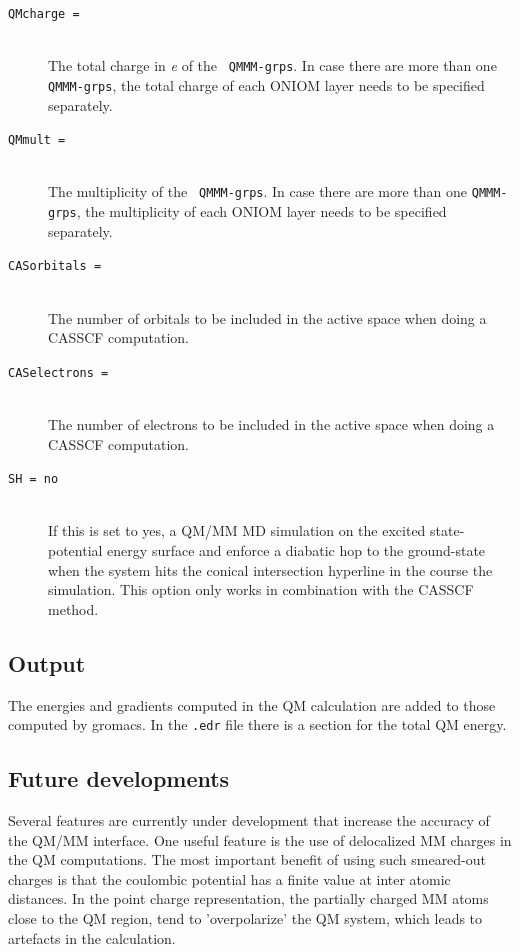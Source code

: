 \begin{description}
\item[\tt QMcharge = ]\mbox{}\\The total charge in {\it{e}} of the {\tt
QMMM-grps}. In case there are more than one {\tt QMMM-grps}, the total
charge of each ONIOM layer needs to be specified separately.

\item[\tt QMmult = ]\mbox{}\\The multiplicity of the {\tt
QMMM-grps}. In case there are more than one {\tt QMMM-grps}, the
multiplicity of each ONIOM layer needs to be specified separately.

\item[\tt CASorbitals = ]\mbox{}\\The number of orbitals to be
included in the active space when doing a CASSCF computation.

\item[\tt CASelectrons = ]\mbox{}\\The number of electrons to be
included in the active space when doing a CASSCF computation.

\item[\tt SH = no]\mbox{}\\If this is set to yes, a QM/MM MD
simulation on the excited state-potential energy surface and enforce a
diabatic hop to the ground-state when the system hits the conical
intersection hyperline in the course the simulation. This option only
works in combination with the CASSCF method.

\end{description}

\subsection{Output}

The energies and gradients computed in the QM calculation are added to
those computed by gromacs. In the {\tt .edr} file there is a section
for the total QM energy.

\subsection{Future developments}

Several features are currently under development that increase the
accuracy of the QM/MM interface. One useful feature is the use of
delocalized MM charges in the QM computations. The most important
benefit of using such smeared-out charges is that the coulombic
potential has a finite value at inter atomic distances. In the point
charge representation, the partially charged MM atoms close to the QM
region, tend to 'overpolarize' the QM system, which leads to artefacts
in the calculation.

